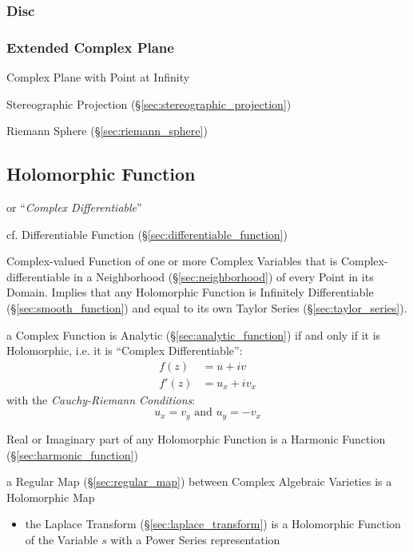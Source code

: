 \subsubsection{Disc}\label{sec:disc}

\subsubsection{Extended Complex Plane}\label{sec:extended_complex_plane}

Complex Plane with Point at Infinity

Stereographic Projection (\S\ref{sec:stereographic_projection})

Riemann Sphere (\S\ref{sec:riemann_sphere})



\subsection{Holomorphic Function}\label{sec:holomorphic_function}

or ``\emph{Complex Differentiable}''

cf. Differentiable Function (\S\ref{sec:differentiable_function})

Complex-valued Function of one or more Complex Variables that is
Complex-differentiable in a Neighborhood (\S\ref{sec:neighborhood}) of
every Point in its Domain. Implies that any Holomorphic Function is
Infinitely Differentiable (\S\ref{sec:smooth_function}) and equal to
its own Taylor Series (\S\ref{sec:taylor_series}).

a Complex Function is Analytic (\S\ref{sec:analytic_function}) if and only if
it is Holomorphic, i.e. it is ``Complex Differentiable'':
\begin{align*}
  f(z)  & = u + iv \\
  f'(z) & = u_x + iv_x
\end{align*}
with the \emph{Cauchy-Riemann Conditions}:
\[
  u_x = v_y \text{ and } u_y = - v_x
\]

Real or Imaginary part of any Holomorphic Function is a Harmonic
Function (\S\ref{sec:harmonic_function})

a Regular Map (\S\ref{sec:regular_map}) between Complex Algebraic Varieties is
a Holomorphic Map


\begin{itemize}
  \item the Laplace Transform (\S\ref{sec:laplace_transform}) is a Holomorphic
    Function of the Variable $s$ with a Power Series representation
\end{itemize}



